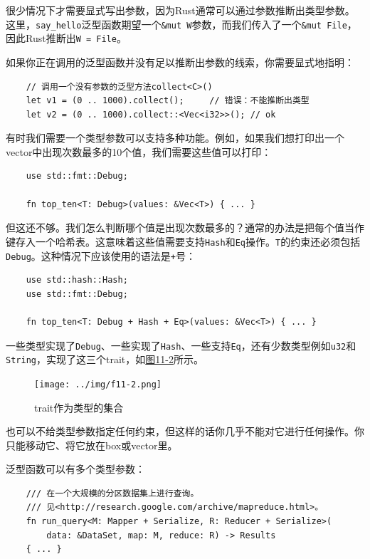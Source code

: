 很少情况下才需要显式写出参数，因为Rust通常可以通过参数推断出类型参数。这里，\texttt{say\_hello}泛型函数期望一个\texttt{\&mut W}参数，而我们传入了一个\texttt{\&mut File}，因此Rust推断出\texttt{W = File}。

如果你正在调用的泛型函数并没有足以推断出参数的线索，你需要显式地指明：
\begin{verbatim}
    // 调用一个没有参数的泛型方法collect<C>()
    let v1 = (0 .. 1000).collect();     // 错误：不能推断出类型
    let v2 = (0 .. 1000).collect::<Vec<i32>>(); // ok
\end{verbatim}

有时我们需要一个类型参数可以支持多种功能。例如，如果我们想打印出一个vector中出现次数最多的10个值，我们需要这些值可以打印：
\begin{verbatim}
    use std::fmt::Debug;

    fn top_ten<T: Debug>(values: &Vec<T>) { ... }
\end{verbatim}

但这还不够。我们怎么判断哪个值是出现次数最多的？通常的办法是把每个值当作键存入一个哈希表。这意味着这些值需要支持\texttt{Hash}和\texttt{Eq}操作。\texttt{T}的约束还必须包括\texttt{Debug}。这种情况下应该使用的语法是\texttt{+}号：
\begin{verbatim}
    use std::hash::Hash;
    use std::fmt::Debug;

    fn top_ten<T: Debug + Hash + Eq>(values: &Vec<T>) { ... }
\end{verbatim}

一些类型实现了\texttt{Debug}、一些实现了\texttt{Hash}、一些支持\texttt{Eq}，还有少数类型例如\texttt{u32}和\texttt{String}，实现了这三个trait，如\hyperref[f11-2]{图11-2}所示。

\begin{figure}[htbp]
    \centering
    \texttt{[image: ../img/f11-2.png]}
    \caption{trait作为类型的集合}
    \label{f11-2}
\end{figure}

也可以不给类型参数指定任何约束，但这样的话你几乎不能对它进行任何操作。你只能移动它、将它放在box或vector里。

泛型函数可以有多个类型参数：
\begin{verbatim}
    /// 在一个大规模的分区数据集上进行查询。
    /// 见<http://research.google.com/archive/mapreduce.html>。
    fn run_query<M: Mapper + Serialize, R: Reducer + Serialize>(
        data: &DataSet, map: M, reduce: R) -> Results
    { ... }
\end{verbatim}


